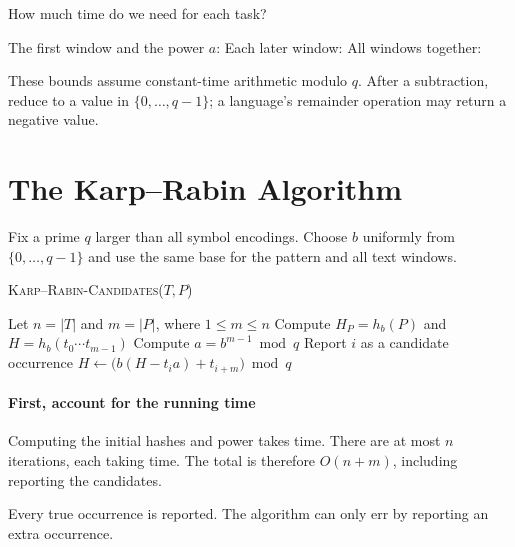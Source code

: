 \documentclass[11pt]{article}
\begin{document}
\begin{Qu}
    How much time do we need for each task?
    \begin{itemize}
        \aitem The first window and the power $a$: 
        \bitem Each later window: 
        \citem All windows together: 
    \end{itemize}
\end{Qu}

\vfill
These bounds assume constant-time arithmetic modulo $q$. After a subtraction,
reduce to a value in $\{0,\ldots,q-1\}$; a language's remainder operation may
return a negative value.

\newpage
\section{The Karp--Rabin Algorithm}
Fix a prime $q$ larger than all symbol encodings. Choose $b$ uniformly from
$\{0,\ldots,q-1\}$ and use the same base for the pattern and all text windows.

\begin{algorithm}[h]
    \textsc{Karp--Rabin-Candidates}($T,P$)
    \begin{algorithmic}
        \State Let $n=|T|$ and $m=|P|$, where $1\leq m\leq n$
        \State Compute $H_P=h_b(P)$ and $H=h_b(t_0\cdots t_{m-1})$
        \State Compute $a=b^{m-1}\bmod q$
                \State Report $i$ as a candidate occurrence
            \EndIf
                \State $H\gets\bigl(b(H-t_i a)+t_{i+m}\bigr)\bmod q$
            \EndIf
        \EndFor
    \end{algorithmic}
\end{algorithm}

\paragraph{First, account for the running time}
Computing the initial hashes and power takes  time.
There are at most $n$ iterations, each taking  time.
The total is therefore $O(n+m)$, including reporting the candidates.

\begin{theorem}
    Every true occurrence is reported. The algorithm can only err by
    reporting an extra occurrence.
\end{theorem}
\end{document}
